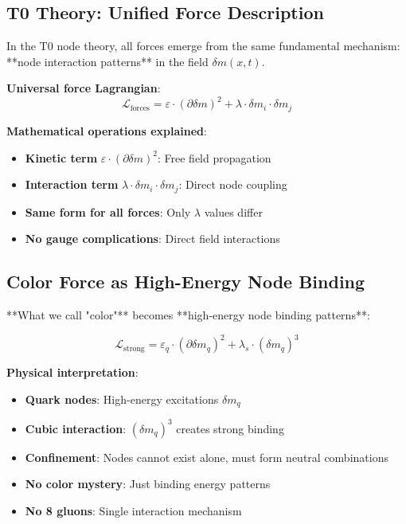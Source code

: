 \documentclass[12pt,a4paper]{article}
\newcommand{\Lag}{\mathcal{L}}
\newcommand{\deltam}{\delta m}
\theoremstyle{definition}
\theoremstyle{remark}
\begin{document}
	\subsection{T0 Theory: Unified Force Description}
	
	In the T0 node theory, all forces emerge from the same fundamental mechanism: **node interaction patterns** in the field $\deltam(x,t)$.
	
	\textbf{Universal force Lagrangian}:
	\begin{equation}
		\boxed{\Lag_{\text{forces}} = \varepsilon \cdot (\partial \deltam)^2 + \lambda \cdot \deltam_i \cdot \deltam_j}
	\end{equation}
	
	\textbf{Mathematical operations explained}:
	\begin{itemize}
		\item \textbf{Kinetic term} $\varepsilon \cdot (\partial \deltam)^2$: Free field propagation
		\item \textbf{Interaction term} $\lambda \cdot \deltam_i \cdot \deltam_j$: Direct node coupling
		\item \textbf{Same form for all forces}: Only $\lambda$ values differ
		\item \textbf{No gauge complications}: Direct field interactions
	\end{itemize}
	
	\subsection{Color Force as High-Energy Node Binding}
	
	**What we call "color"** becomes **high-energy node binding patterns**:
	
	\begin{equation}
		\Lag_{\text{strong}} = \varepsilon_q \cdot (\partial \deltam_q)^2 + \lambda_s \cdot (\deltam_q)^3
	\end{equation}
	
	\textbf{Physical interpretation}:
	\begin{itemize}
		\item \textbf{Quark nodes}: High-energy excitations $\deltam_q$ 
		\item \textbf{Cubic interaction}: $(\deltam_q)^3$ creates strong binding
		\item \textbf{Confinement}: Nodes cannot exist alone, must form neutral combinations
		\item \textbf{No color mystery}: Just binding energy patterns
		\item \textbf{No 8 gluons}: Single interaction mechanism
	\end{itemize}
	
\end{document}
